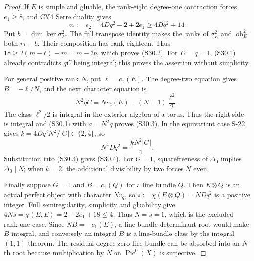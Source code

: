 \begin{proof}
If $E$ is simple and gluable, the rank-eight degree-one
contraction forces $e_1\ge8$, and CY4 Serre duality gives
\[
 m:=e_2=4Dq^2-2+2e_1\ge4Dq^2+14.
\]
Put $b=\dim\ker\sigma_E^2$. The full transpose identity
makes the ranks of $\sigma_E^2$ and
$\operatorname{ob}_E^2$ both $m-b$. Their composition has
rank eighteen. Thus
$18\ge2(m-b)-m=m-2b$, which proves (S30.2).
For $D=q=1$, (S30.1) already contradicts $qC$ being
integral; this proves the assertion without simplicity.

For general positive rank $N$, put $\ell=c_1(E)$.
The degree-two equation gives $B=-\ell/N$, and the
next character equation is
\[
 N^2qC=Nc_2(E)-(N-1)\frac{\ell^2}{2}.
 \tag{S30.8}
\]
The class $\ell^2/2$ is integral in the exterior algebra
of a torus. Thus the right side is integral and (S30.1)
with $a=N^2q$ proves (S30.3). In the equivariant case
S-22 gives $k=4Dq^2N^2/|G|\in\{2,4\}$, so
\[
 N^4Dq^2=\frac{kN^2|G|}{4}.
\]
Substitution into (S30.3) gives (S30.4).
For $G=1$, squarefreeness of $\Delta_0$ implies
$\Delta_0\mid N$; when $k=2$, the additional divisibility
by two forces $N$ even.

Finally suppose $G=1$ and $B=c_1(Q)$ for a line bundle
$Q$. Then $E\otimes Q$ is an actual perfect object with
character $Nv_q$, so $s:=\chi(E\otimes Q)=NDq^2$ is a
positive integer. Full semiregularity, simplicity and
gluability give
$4Ns=\chi(E,E)=2-2e_1+18\le4$.
Thus $N=s=1$, which is the excluded rank-one case.
Since $NB=-c_1(E)$, a line-bundle determinant root would
make $B$ integral, and conversely an integral $B$ is a
line-bundle class by the integral $(1,1)$ theorem.
The residual degree-zero line bundle can be absorbed
into an $N$th root because multiplication by $N$ on
$\operatorname{Pic}^0(X)$ is surjective.
\end{proof}

